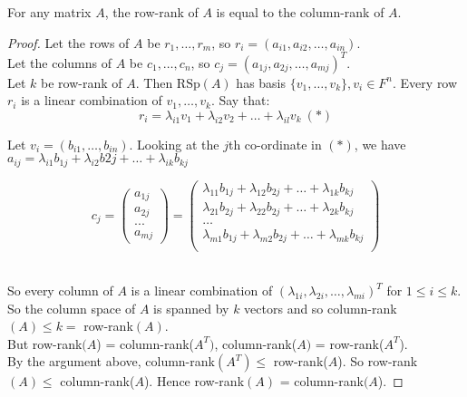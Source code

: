 \begin{theorem} For any matrix $A$, the row-rank of $A$ is equal to the column-rank of $A$.\end{theorem}
 
 \begin{proof}
 Let the rows of $A$ be $r_1, \dots, r_m$, so $r_i = (a_{i1}, a_{i2},\dots,a_{in})$.\\
 
 Let the columns of $A$ be $c_1,\dots,c_n$, so $c_j = (a_{1j}, a_{2j},\dots,a_{mj})^T$.\\
 
 Let $k$ be row-rank of $A$. Then $\text{RSp}(A)$ has basis $\{v_1,\dots,v_k\}, v_i \in F^n$. Every row $r_i$ is a linear combination of $v_1,\dots,v_k$. Say that:
 \[r_i = \lambda_{i1}v_1 + \lambda_{i2}v_2 + \dots + \lambda_{il}v_k ~(*)\]
 
 Let $v_i = (b_{i1}, \dots, b_{in})$. Looking at the $j$th co-ordinate in $(*)$, we have $a_{ij} = \lambda_{i1}b_{1j} + \lambda_{i2}b{2j} + \dots + \lambda_{ik}b_{kj}$
 
 \[c_j = \begin{pmatrix}
 a_{1j}\\a_{2j}\\ ... \\ a_{mj}
\end{pmatrix}
= 
\begin{pmatrix}
\lambda_{11}b_{1j} + \lambda_{12}b_{2j} + \dots + \lambda_{1k}b_{kj}\\
\lambda_{21}b_{2j} + \lambda_{22}b_{2j} + \dots + \lambda_{2k}b_{kj}\\
\dots \\
\lambda_{m1}b_{1j} + \lambda_{m2}b_{2j} + \dots + \lambda_{mk}b_{kj}\\
\end{pmatrix}\]~

So every column of $A$ is a linear combination of $(\lambda_{1i},\lambda_{2i},\dots,\lambda_{mi})^T$ for $1 \leq i \leq k$. So the column space of $A$ is spanned by $k$ vectors and so column-rank$(A) \leq k = $ row-rank$(A)$.\\

 But row-rank$(A$) = column-rank($A^T)$, column-rank($A)$ = row-rank($A^T$).\\
 
  By the argument above, column-rank$(A^T) \leq$ row-rank($A$). So row-rank$(A) \leq$ column-rank($A$). Hence row-rank$(A)$ = column-rank$(A$).
 \end{proof}

